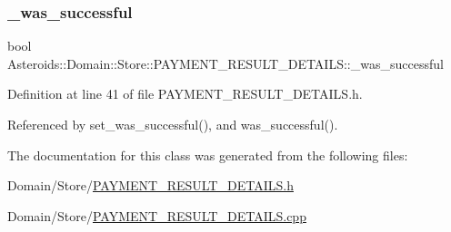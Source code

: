 \subsubsection{\texorpdfstring{\+\_\+was\+\_\+successful}{\_was\_successful}}
{\footnotesize\ttfamily bool Asteroids\+::\+Domain\+::\+Store\+::\+P\+A\+Y\+M\+E\+N\+T\+\_\+\+R\+E\+S\+U\+L\+T\+\_\+\+D\+E\+T\+A\+I\+L\+S\+::\+\_\+was\+\_\+successful\hspace{0.3cm}{\ttfamily [private]}}



Definition at line 41 of file P\+A\+Y\+M\+E\+N\+T\+\_\+\+R\+E\+S\+U\+L\+T\+\_\+\+D\+E\+T\+A\+I\+L\+S.\+h.



Referenced by set\+\_\+was\+\_\+successful(), and was\+\_\+successful().



The documentation for this class was generated from the following files\+:\begin{DoxyCompactItemize}
\item 
Domain/\+Store/\hyperlink{PAYMENT__RESULT__DETAILS_8h}{P\+A\+Y\+M\+E\+N\+T\+\_\+\+R\+E\+S\+U\+L\+T\+\_\+\+D\+E\+T\+A\+I\+L\+S.\+h}\item 
Domain/\+Store/\hyperlink{PAYMENT__RESULT__DETAILS_8cpp}{P\+A\+Y\+M\+E\+N\+T\+\_\+\+R\+E\+S\+U\+L\+T\+\_\+\+D\+E\+T\+A\+I\+L\+S.\+cpp}\end{DoxyCompactItemize}
